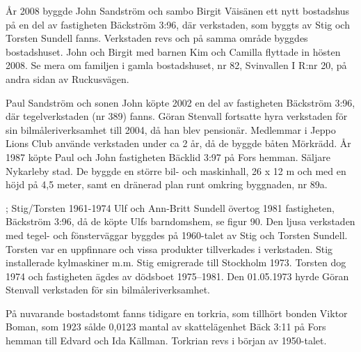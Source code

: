 %
År 2008 byggde John Sandström och sambo Birgit Väisänen ett nytt bostadshus på en del av fastigheten Bäckström 3:96, där verkstaden, som byggts av Stig och Torsten Sundell fanns. Verkstaden revs och på 	samma område byggdes bostadshuset. John och Birgit med barnen Kim och Camilla flyttade in hösten 2008. Se mera om familjen i gamla bostadshuset, nr 82, Svinvallen I R:nr 20, på andra sidan av Ruckusvägen.


%
Paul Sandström och sonen John köpte 2002 en del av fastigheten Bäckström 3:96, där tegelverkstaden (nr 389) fanns. Göran Stenvall fortsatte hyra	verkstaden för sin bilmåleriverksamhet till 2004, då han blev pensionär. Medlemmar i Jeppo Lions Club använde verkstaden under ca 2 år, då de 	byggde båten Mörkrädd. År 1987 köpte Paul och John fastigheten Bäcklid 3:97 på Fors hemman. Säljare Nykarleby stad. De byggde en större bil- och maskinhall, 26 x 12 m och med en höjd på 4,5 meter, samt en dränerad plan runt omkring byggnaden, nr 89a.


%
; Stig/Torsten	1961-1974
Ulf och Ann-Britt Sundell övertog 1981 fastigheten, Bäckström 3:96, då de köpte Ulfs barndomshem, se figur 90. Den ljusa verkstaden med tegel- och fönsterväggar byggdes på 1960-talet av Stig och Torsten Sundell. Torsten var en uppfinnare och vissa produkter tillverkades i 	verkstaden. Stig installerade kylmaskiner m.m. Stig emigrerade till Stockholm 1973. Torsten dog 1974 och fastigheten ägdes av dödsboet 1975--1981. Den 01.05.1973 hyrde Göran Stenvall verkstaden för sin bilmåleriverksamhet.


%
På nuvarande bostadstomt fanns tidigare en torkria, som tillhört bonden	Viktor Boman, som 1923 sålde 0,0123 mantal av skattelägenhet Bäck 3:11 på 	Fors hemman till Edvard och Ida Källman. Torkrian revs i början av	1950-talet.



%



